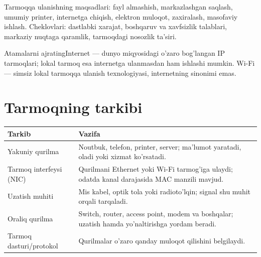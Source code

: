 \documentclass[11pt,a4paper,oneside]{book}
\begin{document}
Tarmoqqa ulanishning maqsadlari: fayl almashish, markazlashgan saqlash, umumiy printer, internetga chiqish, elektron muloqot, zaxiralash, masofaviy ishlash. Cheklovlari: dastlabki xarajat, boshqaruv va xavfsizlik talablari, markaziy nuqtaga qaramlik, tarmoqdagi nosozlik ta'siri.
\begin{tip}{Atamalarni ajrating}Internet — dunyo miqyosidagi o'zaro bog'langan IP tarmoqlari; lokal tarmoq esa internetga ulanmasdan ham ishlashi mumkin. Wi-Fi — simsiz lokal tarmoqqa ulanish texnologiyasi, internetning sinonimi emas.\end{tip}
\section{Tarmoqning tarkibi}
\par\medskip
\par\medskip
\begin{tabularx}{\textwidth}{p{}Y}\toprule
Tarkib & Vazifa\\\midrule
Yakuniy qurilma & Noutbuk, telefon, printer, server; ma'lumot yaratadi, oladi yoki xizmat ko'rsatadi.\\
Tarmoq interfeysi (NIC) & Qurilmani Ethernet yoki Wi-Fi tarmog'iga ulaydi; odatda kanal darajasida MAC manzili mavjud.\\
Uzatish muhiti & Mis kabel, optik tola yoki radioto'lqin; signal shu muhit orqali tarqaladi.\\
Oraliq qurilma & Switch, router, access point, modem va boshqalar; uzatish hamda yo'naltirishga yordam beradi.\\
Tarmoq dasturi/protokol & Qurilmalar o'zaro qanday muloqot qilishini belgilaydi.\\\bottomrule\end{tabularx}
\end{document}
